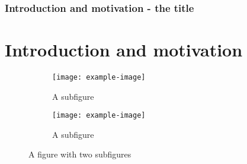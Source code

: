 \documentclass{beamer}
\begin{document}
\begin{frame}
\frametitle{Introduction and motivation - the title}
\section[Motivation]{Introduction and motivation}
\begin{figure}
\centering
\begin{subfigure}{.45\textwidth}
  \centering
  \texttt{[image: example-image]}
  \caption{A subfigure\footnotemark[1]}
  \label{fig:sub1}
\end{subfigure}%
\begin{subfigure}{.45\textwidth}
  \centering
  \texttt{[image: example-image]}
  \caption{A subfigure\footnotemark[2]}
  \label{fig:sub2}
\end{subfigure}
\caption{A figure with two subfigures\footnotemark[3]}
\label{fig:test}
\end{figure}

\addtocounter{footnote}{1}
\addtocounter{footnote}{1}
\addtocounter{footnote}{1}
\end{frame}
\end{document}
